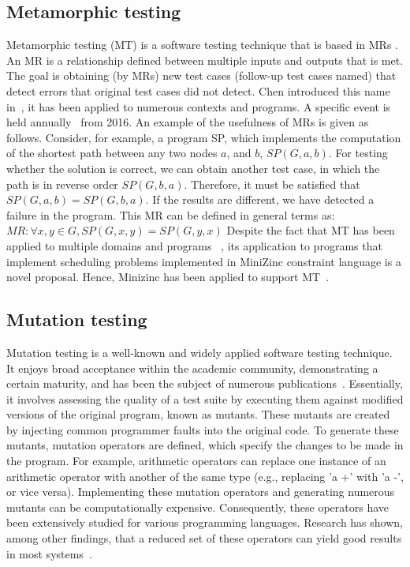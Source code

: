 \subsection{Metamorphic testing}
Metamorphic testing (MT) is a software testing technique that is based in MRs \cite{segura2011automated}.
An MR is a relationship defined between multiple inputs and outputs that is met.
The goal is obtaining (by MRs) new test cases (follow-up test cases named) that detect errors that original test cases did not detect. Chen introduced this name in~\cite{chen1998metamorphic}, it has been applied to numerous contexts and programs. A specific event is held annually~\cite{ 7961643,Xie:2019:3340651} from 2016.
An example of the usefulness of MRs is given as follows. Consider, for example, a program SP, which implements the computation of the shortest path between any two nodes $a$, and $b$, $SP(G,a,b)$. For testing whether the solution is correct, we can obtain another test case, in which the path is in reverse order $SP(G,b,a)$. Therefore, it must be satisfied that $SP(G,a,b)= SP(G,b,a)$. If the results are different, we have detected a failure in the program. This MR can be defined in general terms as:
$MR: \forall x, y \in G, SP(G, x,y) = SP(G, y,x) $
Despite the fact that MT has been applied to multiple domains and programs ~\cite{Chen:2018:MTR:3177787.3143561,almendros2021metamorphic}, its application to programs that implement scheduling problems implemented in MiniZinc constraint language is a novel proposal. Hence, Minizinc has been applied to support MT~\cite{de2019using}.\\


\subsection{Mutation testing}
Mutation testing is a well-known and widely applied software testing technique. It enjoys broad acceptance within the academic community, demonstrating a certain maturity, and has been the subject of numerous publications~\cite{parsai2literature, PAPADAKIS2019275}. Essentially, it involves assessing the quality of a test suite by executing them against modified versions of the original program, known as mutants. These mutants are created by injecting common programmer faults into the original code. To generate these mutants, mutation operators are defined, which specify the changes to be made in the program. For example, arithmetic operators can replace one instance of an arithmetic operator with another of the same type (e.g., replacing 'a +' with 'a -', or vice versa). Implementing these mutation operators and generating numerous mutants can be computationally expensive. Consequently, these operators have been extensively studied for various programming languages. Research has shown, among other findings, that a reduced set of these operators can yield good results in most systems~\cite{Offutt96OpMut}.

